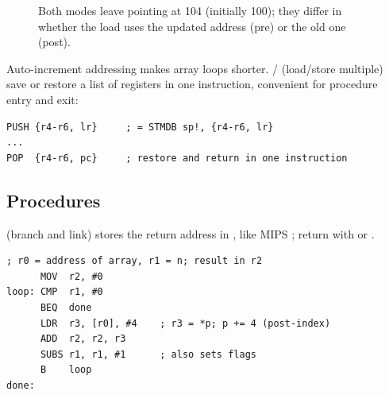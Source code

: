 \begin{figure}[H]
\centering
{}
\caption{Both modes leave  pointing at 104 (initially 100); they
differ in whether the load uses the updated address (pre) or the old one
(post).}
\end{figure}
Auto-increment addressing makes array loops shorter. /
(load/store multiple) save or restore a list of registers in one instruction,
convenient for procedure entry and exit:
\begin{lstlisting}[style=arm]
PUSH {r4-r6, lr}     ; = STMDB sp!, {r4-r6, lr}
...
POP  {r4-r6, pc}     ; restore and return in one instruction
\end{lstlisting}

\subsection{Procedures}

 (branch and link) stores the return address in ,
like MIPS ; return with  or .

\begin{example}
\begin{lstlisting}[style=arm]
; r0 = address of array, r1 = n; result in r2
      MOV  r2, #0
loop: CMP  r1, #0
      BEQ  done
      LDR  r3, [r0], #4    ; r3 = *p; p += 4 (post-index)
      ADD  r2, r2, r3
      SUBS r1, r1, #1      ; also sets flags
      B    loop
done:
\end{lstlisting}
\end{example}

